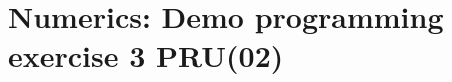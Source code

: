 \documentclass[12pt]{article}
\begin{document}
\section{Numerics: Demo programming exercise 3 PRU(02)}


% 
\end{document}
